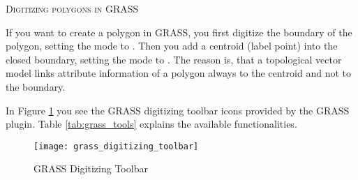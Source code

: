 \begin{Tip}\caption{\textsc{Digitizing polygons in GRASS}}
If you want to create a polygon in GRASS, you first digitize the boundary of 
the polygon, setting the mode to . Then you add a 
centroid (label point) into the closed boundary, setting the mode to 
. The reason is, that a topological vector model links 
attribute information of a polygon always to the centroid and not to the 
boundary.
\end{Tip} 

\label{label_grasstoolbar}

In Figure \ref{fig:grass_digitizing_toolbar} you see the GRASS digitizing
toolbar icons provided by the GRASS plugin. Table \ref{tab:grass_tools}
explains the available functionalities.

\begin{figure}[h]
   \centering
   \texttt{[image: grass\_digitizing\_toolbar]}
   \caption{GRASS Digitizing Toolbar \nixcaption}\label{fig:grass_digitizing_toolbar} 
\end{figure}

